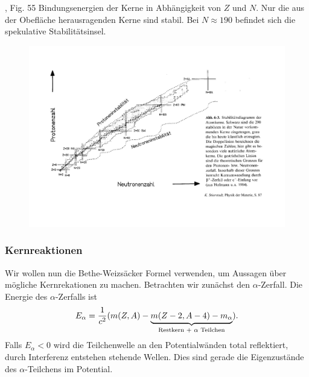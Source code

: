 \begin{enumerate}[label=\arabic{*})]
	{\KuckukKern, Fig. 55}
	{Bindungsenergien der Kerne in Abhängigkeit von $Z$ und $N$. Nur die aus der
	Obefläche herausragenden Kerne sind stabil. Bei $N\approx 190$ befindet sich
	die spekulative Stabilitätsinsel.}

\begin{figure}[H]
	\centering
	\includegraphics[width=\textwidth]{fig/2-Stabilitaetsdiagramm.pdf}
\end{figure}
\end{enumerate}

\subsubsection{Kernreaktionen}

Wir wollen nun die Bethe-Weizsäcker Formel verwenden, um Aussagen über mögliche
Kernrekationen zu machen. Betrachten wir zunächst den $\alpha$-Zerfall. Die
Energie des $\alpha$-Zerfalls ist
\begin{align*}
E_\alpha =\frac{1}{c^2}
(m(Z,A)-\underbrace{m(Z-2,A-4)-m_\alpha}_{\small\text{Restkern +
$\alpha$ Teilchen}}).
\end{align*}
Falls $E_\alpha < 0$ wird die Teilchenwelle an den Potentialwänden
total reflektiert, durch Interferenz entstehen stehende Wellen. Dies sind
gerade die Eigenzustände des $\alpha$-Teilchens im Potential.

